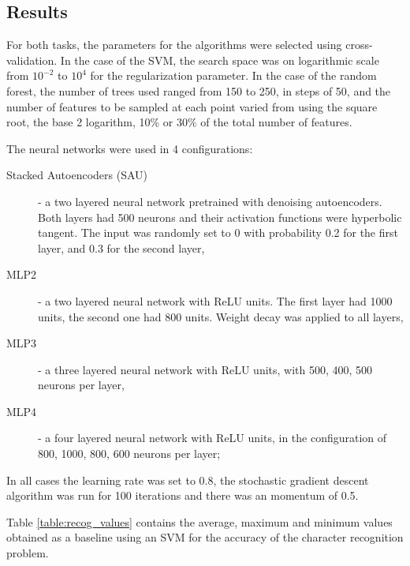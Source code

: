 \subsection{Results}
\label{sec:recog}
For both tasks, the parameters for the algorithms were selected using cross-validation. In the case of the SVM, the search space was on logarithmic scale from $10^{-2}$ to $10^4$ for the regularization parameter. In the case of the random forest, the number of trees used ranged from 150 to 250, in steps of 50, and the number of features to be sampled at each point varied from using the square root, the base 2 logarithm, 10\% or 30\% of the total number of features.

The neural networks were used in 4 configurations: 

\begin{description}


\item[Stacked Autoencoders (SAU)] - a two layered neural network pretrained with denoising autoencoders. Both layers had 500 neurons and their activation functions were hyperbolic tangent.  The input was randomly set to 0 with probability 0.2 for the first layer, and 0.3 for the second layer,
\item[MLP2] - a two layered neural network with ReLU units. The first layer had 1000 units, the second one had 800 units. Weight decay was applied to all layers,
\item[MLP3] - a three layered neural network with ReLU units, with 500, 400, 500 neurons per layer,
\item[MLP4] - a four layered neural network with ReLU units, in the configuration of 800, 1000, 800, 600 neurons per layer;
\end{description}

In all cases the learning rate was set to 0.8, the stochastic gradient descent algorithm was run for 100 iterations and there was an momentum of 0.5.

Table \ref{table:recog_values} contains the average, maximum and minimum values obtained as a baseline using an SVM for the accuracy of the character recognition problem.

